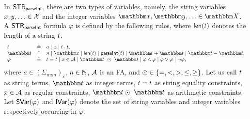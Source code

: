 In ${\sf STR}_{\textsf{parseInt}}$, there are two types of variables, namely, the string variables $x,y,\ldots \in \mathcal{X}$ and the integer variables $\ivarx,\ivary,\ldots \in \ivars$.
%
A ${\sf STR}_{\textsf{parseInt}}$ formula $\varphi$ is defined by the following rules, where $\textsf{len}(t)$ denotes the length of a string $t$.
\[
\begin{array}{l c l}
\sterm & \Def & a \mid \svarx \mid \sterm \concat \sterm, \\
\iterm & \Def & n \mid \ivarx \mid \len(\sterm) \mid \parseInt(\sterm) \mid \iterm + \iterm \mid \iterm - \iterm,\\
\varphi & \Def & \sterm = \sterm \mid x \in \Aut \mid \iterm\ \op\ \iterm \mid \varphi \wedge \varphi \mid \varphi \vee \varphi \mid \neg \varphi,
\end{array}
\]
where $a \in (\Sigma_{\textit{num}})_\varepsilon$, $n \in \mathbb{N}$, $\mathcal{A}$ is an FA, and $\odot \in \{=, < , >, \le, \ge\}$. Let us call $t$ as string terms, $\iterm$ as integer terms, $t = t$ as string equality constraints, $x \in \mathcal{A}$ as regular constraints, $\iterm \op\ \iterm$ as arithmetic constraints. 
Let  $\textsf{SVar}(\varphi)$ and $\textsf{IVar}(\varphi)$ denote the set of string variables and integer variables respectively occurring in $\varphi$.



